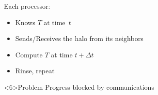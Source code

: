 \documentclass[xcolor={rgb,x11names,svgnames},rgb,x11names,svgnames]{beamer}
\begin{document}
\begin{frame}
\begin{minipage}[T]{7.2cm}
\begin{tikzpicture}[scale=0.4]
\end{tikzpicture}%
\end{minipage}\begin{minipage}[T]{4.5cm}
  Each processor:
  \medskip
  \begin{itemize}
  \item<1-> Knows $T$ at time~$t$
  \item<2-> Sends/Receives the \alert{halo} from its neighbors
  \item<4-> Compute $T$ at time $t + \Delta t$
  \item<5-> Rinse, repeat
  \end{itemize}

  \medskip

  \begin{alertblock}<6>{Problem}
    Progress blocked by communications
  \end{alertblock}
\end{minipage}
\end{frame}


\end{document}
